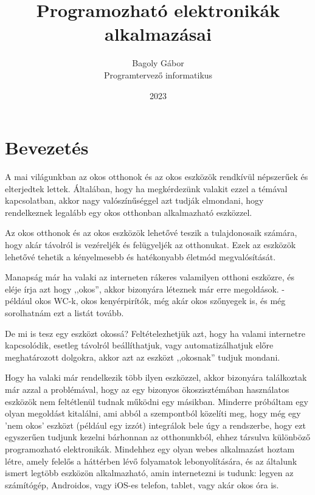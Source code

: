 \documentclass[
]{thesis-ekf}
\theoremstyle{definition}
\theoremstyle{remark}
\begin{document}
	\title{Programozható elektronikák alkalmazásai}
	\author{Bagoly Gábor\\Programtervező informatikus}
	\date{2023}
	\maketitle
	\tableofcontents
	
	\chapter*{Bevezetés}
	
	A mai világunkban az okos otthonok és az okos eszközök rendkívül népszerűek és elterjedtek lettek. Általában, hogy ha megkérdezünk valakit ezzel a témával kapcsolatban, akkor nagy valószínűséggel azt tudják elmondani, hogy rendelkeznek legalább egy okos otthonban alkalmazható eszközzel.
	
	Az okos otthonok és az okos eszközök lehetővé teszik a tulajdonosaik számára, hogy akár távolról is vezéreljék és felügyeljék az otthonukat. Ezek az eszközök lehetővé tehetik a kényelmesebb és hatékonyabb életmód megvalósítását.
	
	Manapság már ha valaki az interneten rákeres valamilyen otthoni eszközre, és eléje írja azt hogy ,,okos'', akkor bizonyára léteznek már erre megoldások. - például okos WC-k, okos kenyérpirítók, még akár okos szőnyegek is, és még sorolhatnám ezt a listát tovább. 
	
	De mi is tesz egy eszközt okossá? Feltételezhetjük azt, hogy ha valami internetre kapcsolódik, esetleg távolról beállíthatjuk, vagy automatizálhatjuk előre meghatározott dolgokra, akkor azt az eszközt ,,okosnak'' tudjuk mondani.
	
	Hogy ha valaki már rendelkezik több ilyen eszközzel, akkor bizonyára találkoztak már azzal a problémával, hogy az egy bizonyos ökoszisztémában használatos eszközök nem feltétlenül tudnak működni egy másikban. Minderre próbáltam egy olyan megoldást kitalálni, ami abból a szempontból közelíti meg, hogy még egy 'nem okos' eszközt (például egy izzót) integrálok bele úgy a rendszerbe, hogy ezt egyszerűen tudjunk kezelni bárhonnan az otthonunkból, ehhez társulva különböző programozható elektronikák. Mindehhez egy olyan webes alkalmazást hoztam létre, amely felelős a háttérben lévő folyamatok lebonyolítására, és az általunk ismert legtöbb eszközön alkalmazható, amin internetezni is tudunk: legyen az számítógép, Androidos, vagy iOS-es telefon, tablet, vagy akár okos óra is.
	
\end{document}
